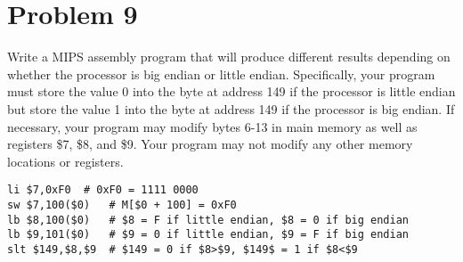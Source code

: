 \documentclass[10pt,letterpaper]{article}
\begin{document}
\section{Problem 9}
Write a MIPS assembly program that will produce different results depending on whether the processor is big endian or little endian. Specifically, your program must store the value 0 into the byte at address 149 if the processor is little endian but store the value 1 into the byte at address 149 if the processor is big endian. If necessary, your program may modify bytes 6-13 in main memory
as well as registers \$7, \$8, and \$9. Your program may not modify any other memory locations or registers.
\begin{lstlisting}
li $7,0xF0 	# 0xF0 = 1111 0000
sw $7,100($0) 	# M[$0 + 100] = 0xF0
lb $8,100($0) 	# $8 = F if little endian, $8 = 0 if big endian
lb $9,101($0) 	# $9 = 0 if little endian, $9 = F if big endian
slt $149,$8,$9 	# $149 = 0 if $8>$9, $149$ = 1 if $8<$9
\end{lstlisting}
\pagebreak
\end{document}

